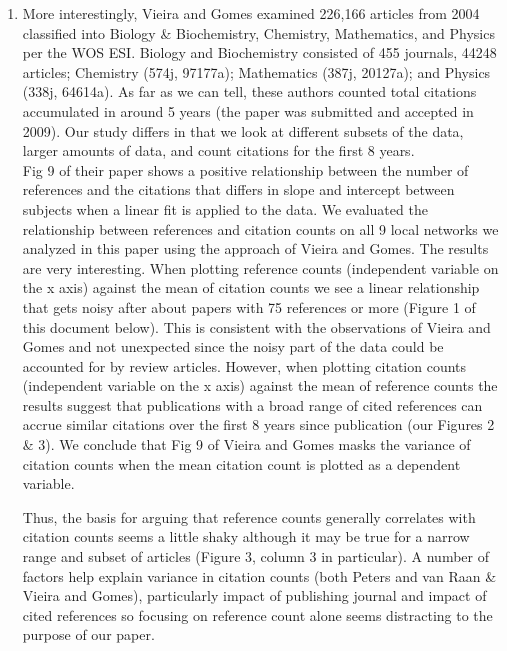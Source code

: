 \documentclass[11pt, oneside]{article}   	%
\begin{document}
\begin{itemize}
\begin{enumerate}
\item More interestingly, Vieira and Gomes examined 226,166 articles from 2004 classified into Biology \& Biochemistry, Chemistry, Mathematics, and Physics per the WOS ESI. Biology and Biochemistry consisted of 455 journals, 44248 articles; Chemistry (574j, 97177a); Mathematics (387j, 20127a); and Physics (338j, 64614a). As far as we can tell, these authors counted total citations accumulated in around 5 years (the paper was submitted and accepted in 2009).  Our study differs in that we look at different subsets of the data, larger amounts of data, and count citations for the first 8 years. \\
\vspace{3mm}
Fig 9 of their paper shows a positive relationship between the number of references and the citations that differs in slope and intercept between subjects when a linear fit is applied to the data.  We evaluated the relationship between references and citation counts on all 9 local networks we analyzed in this paper using the approach of Vieira and Gomes. The results are very interesting. When plotting reference counts (independent variable on the x axis) against the mean of citation counts we see a linear relationship that gets noisy after about papers with 75 references or more (Figure 1 of this document below). This is consistent with the observations of Vieira and Gomes and not unexpected since the noisy part of the data could be accounted for by review articles. However, when plotting citation counts (independent variable on the x axis) against the mean of reference counts the results suggest that publications with a broad range of cited references can accrue similar citations over the first 8 years since publication (our Figures 2 \& 3). We conclude that Fig 9 of Vieira and Gomes masks the variance of citation counts when the mean citation count is plotted as a dependent variable. 

Thus, the basis for arguing that reference counts generally correlates with citation counts seems a little shaky although it may be true for a narrow range and subset of articles (Figure 3, column 3 in particular). A number of factors help explain variance in citation counts (both Peters and van Raan \& Vieira and Gomes), particularly impact of publishing journal and impact of cited references so focusing on reference count alone seems distracting to the purpose of our paper. 


\end{enumerate}
\end{itemize}
\end{document}
